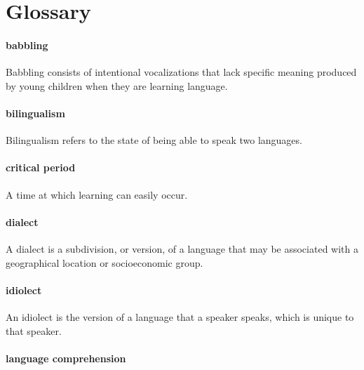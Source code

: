 \documentclass[
]{krantz}
\begin{document}
\section{Glossary}\label{glossary-7}

\paragraph*{babbling}\label{babbling}

Babbling consists of intentional vocalizations that lack specific meaning produced by young children when they are learning language.

\paragraph*{bilingualism}\label{bilingualism-1}

Bilingualism refers to the state of being able to speak two languages.

\paragraph*{critical period}\label{critical-period}

A time at which learning can easily occur.

\paragraph*{dialect}\label{dialect}

A dialect is a subdivision, or version, of a language that may be associated with a geographical location or socioeconomic group.

\paragraph*{idiolect}\label{idiolect}

An idiolect is the version of a language that a speaker speaks, which is unique to that speaker.

\paragraph*{language comprehension}\label{language-comprehension}
\end{document}
